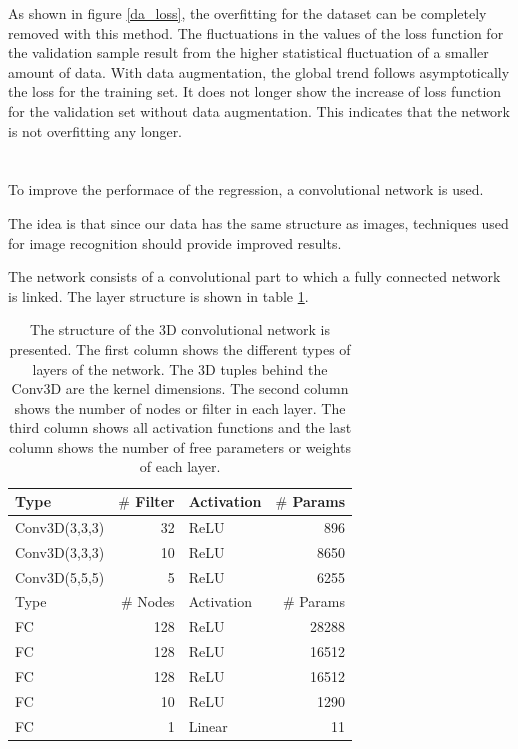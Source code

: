 \documentclass[12pt, a4paper]{thesis}
\begin{document}
As shown in figure \ref{da_loss}, the overfitting for the dataset can
be completely removed with this method.  The fluctuations in the
values of the loss function for the validation sample result from the
higher statistical fluctuation of a smaller amount of data. With data
augmentation, the global trend follows asymptotically the loss for the
training set. It does not longer show the increase of loss function
for the validation set without data augmentation. This indicates that
the network is not overfitting any longer.

\section{}

To improve the performace of the regression, a convolutional network
is used.

The idea is that since our data has the same structure as images,
techniques used for image recognition should provide improved results.

The network consists of a convolutional part to which a fully
connected network is linked. The layer structure is shown in table
\ref{conv_structure}.

\begin{table}[htbp]
  \centering
  \begin{tabular}{lrlr}
    Type & \(\#\) Filter & Activation & \(\#\) Params\\
    \hline
    Conv3D(3,3,3) & 32 & ReLU & 896\\
    Conv3D(3,3,3) & 10 & ReLU & 8650\\
    Conv3D(5,5,5) & 5 & ReLU & 6255\\
    \hline
    Type & \(\#\) Nodes & Activation & \(\#\) Params\\
    \hline
    FC & 128 & ReLU & 28288\\
    FC & 128 & ReLU & 16512\\
    FC & 128 & ReLU & 16512\\
    FC & 10 & ReLU & 1290\\
    FC & 1 & Linear & 11\\
  \end{tabular}
  \caption{The structure of the 3D convolutional network is
    presented. The first column shows the different types of layers of
    the network. The 3D tuples behind the Conv3D are the kernel
    dimensions. The second column shows the number of nodes or filter
    in each layer. The third column shows all activation functions and
    the last column shows the number of free parameters or weights of
    each layer.}
  \label{conv_structure}
\end{table}
\end{document}

